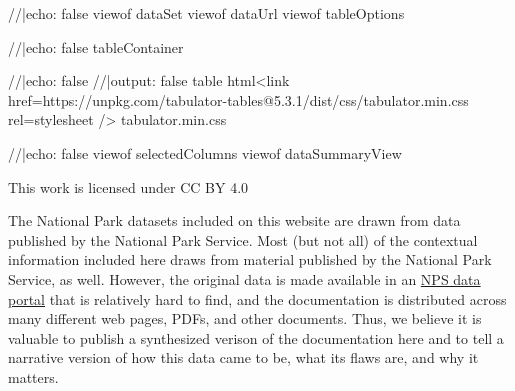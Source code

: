 \documentclass[
  letterpaper,
  DIV=11,
  numbers=noendperiod]{scrartcl}
\newenvironment{Shaded}{\begin{snugshade}}{\end{snugshade}}
\newcommand{\NormalTok}[1]{\textcolor[rgb]{0.00,0.23,0.31}{#1}}
\begin{document}
\begin{Shaded}
\begin{Highlighting}[]
\NormalTok{//|echo: false}
\NormalTok{viewof dataSet}
\NormalTok{viewof dataUrl}
\NormalTok{viewof tableOptions}
\end{Highlighting}
\end{Shaded}

\begin{Shaded}
\begin{Highlighting}[]
\NormalTok{//|echo: false}
\NormalTok{tableContainer}
\end{Highlighting}
\end{Shaded}

\begin{Shaded}
\begin{Highlighting}[]
\NormalTok{//|echo: false}
\NormalTok{//|output: false}
\NormalTok{table}
\NormalTok{html\textasciigrave{}\textless{}link href=\textquotesingle{}https://unpkg.com/tabulator{-}tables@5.3.1/dist/css/tabulator.min.css\textquotesingle{} rel=\textquotesingle{}stylesheet\textquotesingle{} /\textgreater{}}
\NormalTok{tabulator.min.css\textasciigrave{}}
\end{Highlighting}
\end{Shaded}

\begin{Shaded}
\begin{Highlighting}[]
\NormalTok{//|echo: false}
\NormalTok{viewof selectedColumns}
\NormalTok{viewof dataSummaryView}
\end{Highlighting}
\end{Shaded}

\begin{tcolorbox}[enhanced jigsaw, bottomrule=.15mm, colback=white, colbacktitle=quarto-callout-tip-color!10!white, coltitle=black, titlerule=0mm, leftrule=.75mm, toprule=.15mm, opacitybacktitle=0.6, colframe=quarto-callout-tip-color-frame, opacityback=0, rightrule=.15mm, breakable, bottomtitle=1mm, toptitle=1mm, title={Creative Commons License}, left=2mm, arc=.35mm]

This work is licensed under CC BY 4.0

\end{tcolorbox}

The National Park datasets included on this website are drawn from data
published by the National Park Service. Most (but not all) of the
contextual information included here draws from material published by
the National Park Service, as well. However, the original data is made
available in an \href{https://irma.nps.gov/Stats/}{NPS data portal} that
is relatively hard to find, and the documentation is distributed across
many different web pages, PDFs, and other documents. Thus, we believe it
is valuable to publish a synthesized verison of the documentation here
and to tell a narrative version of how this data came to be, what its
flaws are, and why it matters.
\end{document}
